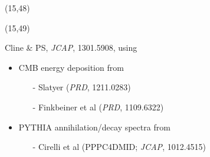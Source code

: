 \documentclass[xcolor=dvipsnames]{beamer}
\begin{document}
\begin{frame}
\begin{textblock}{70}(15,48)
\end{textblock}

\begin{textblock}{80}(15,49)
  {
    Cline \& PS, \textit{JCAP}, 1301.5908, using
    \begin{itemize}
      \item CMB energy deposition from\begin{itemize}
        \footnotesize \item[-] Slatyer (\textit{PRD}, 1211.0283)
        \item[-] Finkbeiner et al (\textit{PRD}, 1109.6322)
      \end{itemize}
      \item PYTHIA annihilation/decay spectra from
      \begin{itemize}
        \footnotesize \item[-] Cirelli et al (PPPC4DMID; \textit{JCAP}, 1012.4515)
      \end{itemize}
    \end{itemize}
  }
\end{textblock}


\end{frame}
\end{document}
